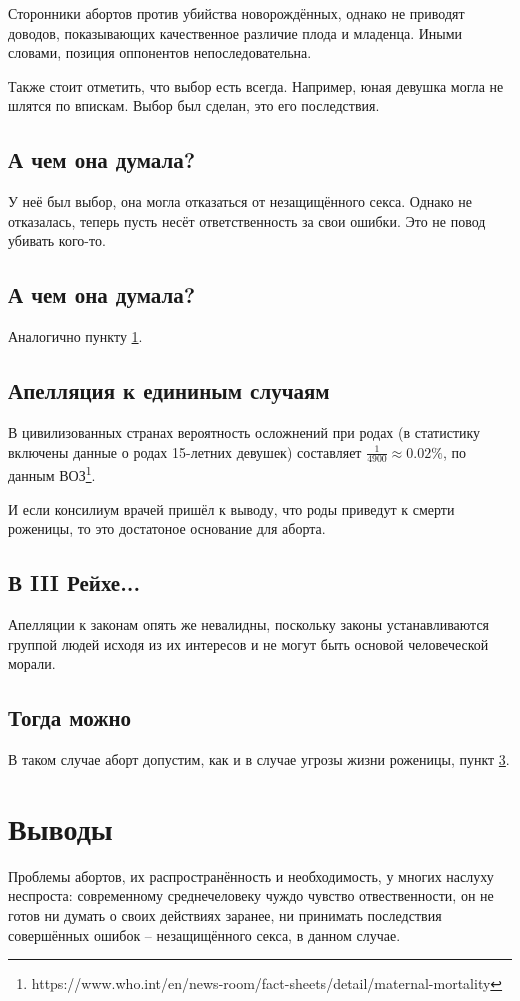 \documentclass[a4paper,12pt]{report}
\begin{document}
        Сторонники абортов против убийства новорождённых, однако не приводят
        доводов, показывающих качественное различие плода и младенца. Иными словами,
        позиция оппонентов непоследовательна.

        Также стоит отметить, что выбор есть всегда. Например, юная девушка 
        могла не шлятся по впискам. Выбор был сделан, это его последствия.
    \section{А чем она думала?}\label{thing-about-it}
        У неё был выбор, она могла отказаться от незащищённого секса. Однако не отказалась, 
        теперь пусть несёт ответственность за свои ошибки. Это не повод убивать кого-то.
	\section{А чем она думала?}
        Аналогично пункту \ref{thing-about-it}.
    \section{Апелляция к едининым случаям}\label{ifdie}
        В цивилизованных странах вероятность осложнений при родах
        (в статистику включены данные о родах 15-летних девушек)
        составляет $ \frac{1}{4900} \approx 0.02\% $, по данным ВОЗ\footnote{https://www.who.int/en/news-room/fact-sheets/detail/maternal-mortality}.

        И если консилиум врачей пришёл к выводу, что роды приведут к 
        смерти роженицы, то это достатоное основание для аборта.
    \section{В III Рейхе...}\label{lawsp}
        Апелляции к законам опять же невалидны, поскольку законы устанавливаются группой 
        людей исходя из их интересов и не могут быть основой человеческой морали. 
	\section{Тогда можно}
        В таком случае аборт допустим, как и в случае угрозы жизни роженицы, пункт \ref{ifdie}.


\chapter{Выводы}
Проблемы абортов, их распространённость и необходимость, у многих наслуху неспроста: 
современному среднечеловеку чуждо чувство отвественности, он не готов ни думать о 
своих действиях заранее, ни принимать последствия совершённых ошибок -- незащищённого 
секса, в данном случае.
\end{document}
